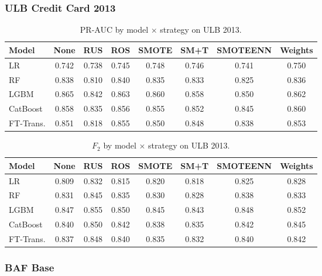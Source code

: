 
\subsubsection{ULB Credit Card 2013}

\begin{table}[ht]
\centering
\caption{PR-AUC by model $\times$ strategy on ULB 2013.}
\label{tab:factorial_ulb_prauc}
\begin{tabular}{l c c c c c c c}
\toprule
Model & None & RUS & ROS & SMOTE & SM+T & SMOTEENN & Weights \\
\midrule
LR        & 0.742 & 0.738 & 0.745 & 0.748 & 0.746 & 0.741 & 0.750 \\
RF        & 0.838 & 0.810 & 0.840 & 0.835 & 0.833 & 0.825 & 0.836 \\
LGBM      & 0.865 & 0.842 & 0.863 & 0.860 & 0.858 & 0.850 & 0.862 \\
CatBoost  & 0.858 & 0.835 & 0.856 & 0.855 & 0.852 & 0.845 & 0.860 \\
FT-Trans. & 0.851 & 0.818 & 0.855 & 0.850 & 0.848 & 0.838 & 0.853 \\
\bottomrule
\end{tabular}
\end{table}

\begin{table}[ht]
\centering
\caption{$F_2$ by model $\times$ strategy on ULB 2013.}
\label{tab:factorial_ulb_f2}
\begin{tabular}{l c c c c c c c}
\toprule
Model & None & RUS & ROS & SMOTE & SM+T & SMOTEENN & Weights \\
\midrule
LR        & 0.809 & 0.832 & 0.815 & 0.820 & 0.818 & 0.825 & 0.828 \\
RF        & 0.831 & 0.845 & 0.835 & 0.830 & 0.828 & 0.838 & 0.833 \\
LGBM      & 0.847 & 0.855 & 0.850 & 0.845 & 0.843 & 0.848 & 0.852 \\
CatBoost  & 0.840 & 0.850 & 0.842 & 0.838 & 0.835 & 0.842 & 0.845 \\
FT-Trans. & 0.837 & 0.848 & 0.840 & 0.835 & 0.832 & 0.840 & 0.842 \\
\bottomrule
\end{tabular}
\end{table}


\subsubsection{BAF Base}


